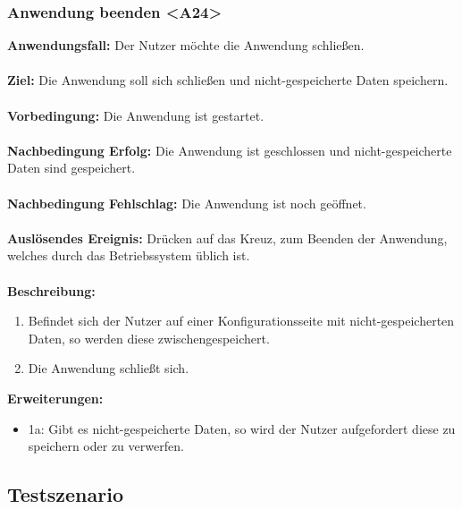 \documentclass[parskip=full]{scrartcl} %
\begin{document}
\subsubsection*{Anwendung beenden <A24>}
\textbf{Anwendungsfall:} Der Nutzer möchte die Anwendung schließen.\\\\
\textbf{Ziel:} Die Anwendung soll sich schließen und nicht-gespeicherte Daten speichern. \\\\
\textbf{Vorbedingung:} Die Anwendung ist gestartet.\\\\
\textbf{Nachbedingung Erfolg:} Die Anwendung ist geschlossen und nicht-gespeicherte Daten sind gespeichert.\\\\
\textbf{Nachbedingung Fehlschlag:} Die Anwendung ist noch geöffnet.\\\\
\textbf{Auslösendes Ereignis:} Drücken auf das Kreuz, zum Beenden der Anwendung, welches durch das Betriebssystem üblich ist. \\\\
\textbf{Beschreibung:}
\begin{enumerate}
    \item Befindet sich der Nutzer auf einer Konfigurationsseite mit nicht-gespeicherten Daten, so werden diese zwischengespeichert.
    \item Die Anwendung schließt sich.
\end{enumerate}
\textbf{Erweiterungen:} 
\begin{itemize}
    \item 1a: Gibt es nicht-gespeicherte Daten, so wird der Nutzer aufgefordert diese zu speichern oder zu verwerfen.
\end{itemize}
\newpage





\subsection{Testszenario}
\end{document}
